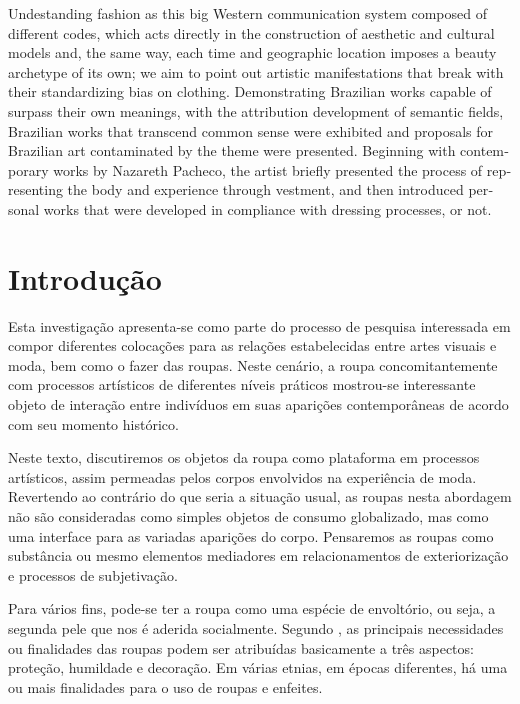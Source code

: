 \begin{refsection}
\begin{otherlanguage}{english}
    \begin{galoResumo}[Abstract]
        Undestanding fashion as this big Western communication system composed of different codes, which acts directly in the construction of aesthetic and cultural models and, the same way, each time and geographic location imposes a beauty archetype of its own; we aim to point out artistic manifestations that break with their standardizing bias on clothing. Demonstrating Brazilian works capable of surpass their own meanings, with the attribution development of semantic fields, Brazilian works that transcend common sense were exhibited and proposals for Brazilian art contaminated by the theme were presented. Beginning with contemporary works by Nazareth Pacheco, the artist briefly presented the process of representing the body and experience through vestment, and then introduced personal works that were developed in compliance with dressing processes, or not.
    \end{galoResumo}
    
    \end{otherlanguage}

    \section{Introdução}

    Esta investigação apresenta-se como parte do processo de pesquisa interessada em compor diferentes colocações para as relações estabelecidas entre artes visuais e moda, bem como o fazer das roupas. Neste cenário, a roupa concomitantemente com processos artísticos de diferentes níveis práticos mostrou-se interessante objeto de interação entre indivíduos em suas aparições contemporâneas de acordo com seu momento histórico. 

    Neste texto, discutiremos os objetos da roupa como plataforma em processos artísticos, assim permeadas pelos corpos envolvidos na experiência de moda. Revertendo ao contrário do que seria a situação usual, as roupas nesta abordagem não são consideradas como simples objetos de consumo globalizado, mas como uma interface para as variadas aparições do corpo. Pensaremos as roupas como substância ou mesmo elementos mediadores em relacionamentos de exteriorização e processos de subjetivação. 

    Para vários fins, pode-se ter a roupa como uma espécie de envoltório, ou seja, a segunda pele que nos é aderida socialmente. Segundo \textcite[p.~34]{Mendonca2006Reflexo}, as principais necessidades ou finalidades das roupas podem ser atribuídas basicamente a três aspectos: proteção, humildade e decoração. Em várias etnias, em épocas diferentes, há uma ou mais finalidades para o uso de roupas e enfeites. 


\end{refsection}

